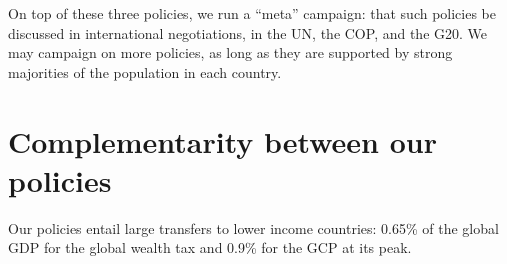 \documentclass[12pt,english]{article}
\begin{document}
On top of these three policies, we run a ``meta'' campaign: that such policies be discussed in international negotiations, in the UN, the COP, and the G20. 
We may campaign on more policies, as long as they are supported by strong majorities of the population in each country. 

\section{Complementarity between our policies}

Our policies entail large transfers to lower income countries: 0.65\% of the global GDP for the global wealth tax and 0.9\% for the GCP at its peak. 




\end{document}
